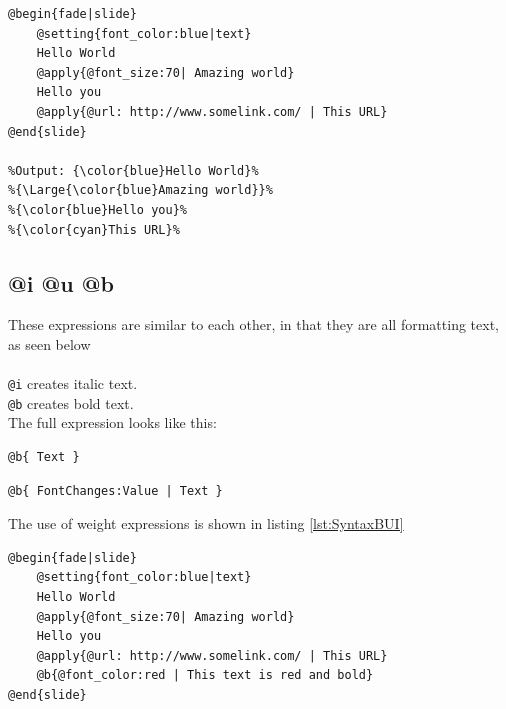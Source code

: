 {\begin{lstlisting}[frame=single, caption=Hello World with an URL, label=lst:SyntaxURL]
@begin{fade|slide}
    @setting{font_color:blue|text}
    Hello World
    @apply{@font_size:70| Amazing world}
    Hello you
    @apply{@url: http://www.somelink.com/ | This URL}
@end{slide}

%Output: {\color{blue}Hello World}%
%{\Large{\color{blue}Amazing world}}%
%{\color{blue}Hello you}%
%{\color{cyan}This URL}%
\end{lstlisting}

\subsection{@i @u @b}
These expressions are similar to each other, in that they are all formatting text, as seen below \\

 \\
\texttt{@i} creates italic text. \\
\texttt{@b} creates bold text. \\
The full expression looks like this:
\begin{lstlisting}[frame=single]
@b{ Text }
\end{lstlisting}


\begin{lstlisting}[frame=single, caption=font weight expression generic]
@b{ FontChanges:Value | Text }
\end{lstlisting}

The use of weight expressions is shown in listing \ref{lst:SyntaxBUI}
\begin{lstlisting}[frame=single, caption=Hello World with font weight, label=lst:SyntaxBUI]
@begin{fade|slide}
    @setting{font_color:blue|text}
    Hello World
    @apply{@font_size:70| Amazing world}
    Hello you
    @apply{@url: http://www.somelink.com/ | This URL}
    @b{@font_color:red | This text is red and bold}
@end{slide}


\end{lstlisting}}
